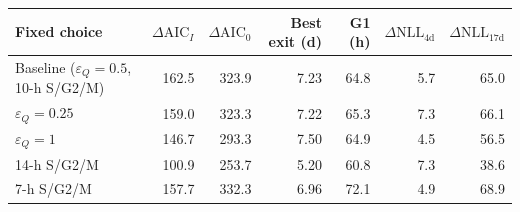 \begin{tabular}{@{}lrrrrrr@{}}
\toprule
Fixed choice & $\Delta\mathrm{AIC}_I$ & $\Delta\mathrm{AIC}_0$ & Best exit (d) & G1 (h) & $\Delta\mathrm{NLL}_{4\mathrm{d}}$ & $\Delta\mathrm{NLL}_{17\mathrm{d}}$ \\
\midrule
Baseline ($\varepsilon_Q=0.5$, 10-h S/G2/M) & 162.5 & 323.9 & 7.23 & 64.8 & 5.7 & 65.0 \\
$\varepsilon_Q=0.25$ & 159.0 & 323.3 & 7.22 & 65.3 & 7.3 & 66.1 \\
$\varepsilon_Q=1$ & 146.7 & 293.3 & 7.50 & 64.9 & 4.5 & 56.5 \\
14-h S/G2/M & 100.9 & 253.7 & 5.20 & 60.8 & 7.3 & 38.6 \\
7-h S/G2/M & 157.7 & 332.3 & 6.96 & 72.1 & 4.9 & 68.9 \\
\bottomrule
\end{tabular}